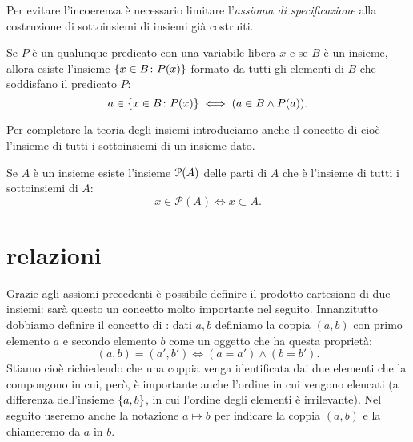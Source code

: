 Per evitare l'incoerenza è necessario limitare l'\emph{assioma di specificazione}
alla costruzione di sottoinsiemi di insiemi già costruiti.

\begin{axiom}[specificazione]
  Se $P$ è un qualunque predicato con una variabile libera $x$
  e se $B$ è un insieme, allora esiste l'insieme 
  $\ENCLOSE {x\in B\colon P(x)}$ formato 
  da tutti gli elementi di $B$ che soddisfano il predicato $P$:
\[
  a \in \ENCLOSE{x\in B\colon P(x)} \iff (a \in B \land P(a)).
\]
\end{axiom}

Per completare la teoria degli insiemi introduciamo anche il concetto di
% 
cioè l'insieme di tutti i sottoinsiemi di un insieme dato.
\begin{axiom}
\label{def:insieme_parti}%
Se $A$ è un insieme esiste l'insieme $\P(A)$ delle parti di $A$
che è l'insieme di tutti i sottoinsiemi di $A$:
\begin{equation}\label{eq:insieme_delle_parti}
  x \in \mathcal P(A) \iff x \subset A.
\end{equation}
\end{axiom}

\section{relazioni}

Grazie agli assiomi precedenti è possibile definire il prodotto cartesiano
di due insiemi: sarà questo un concetto molto importante nel seguito.
Innanzitutto dobbiamo definire il concetto di : dati
$a,b$ definiamo la coppia $(a,b)$ con primo elemento $a$ e secondo elemento $b$
come un oggetto che ha questa proprietà:%
%
\begin{equation}\label{eq:coppia}
  (a, b) = (a', b') \iff (a=a') \land (b=b').
\end{equation}
Stiamo cioè richiedendo che una coppia venga identificata dai due
elementi che la compongono in cui, però, è importante anche l'ordine in
cui vengono elencati (a differenza dell'insieme $\ENCLOSE{a,b}$, in cui
l'ordine degli elementi è irrilevante).
Nel seguito useremo anche la notazione $a \mapsto b$ per indicare 
la coppia $(a,b)$ e la chiameremo  da $a$ in $b$.

